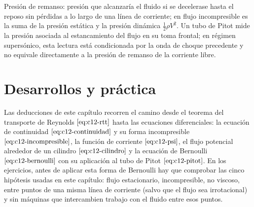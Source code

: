 \documentclass[10pt,openany]{book}
\begin{document}
\begin{tcolorbox}[title={Definición}, studiumdef, breakable]

Presión de remanso: presión que alcanzaría el fluido si se decelerase hasta el reposo sin pérdidas a lo largo de una línea de corriente; en flujo incompresible es la suma de la presión estática y la presión dinámica \(\tfrac12\rho V^{2}\). Un tubo de Pitot mide la presión asociada al estancamiento del flujo en su toma frontal; en régimen supersónico, esta lectura está condicionada por la onda de choque precedente y no equivale directamente a la presión de remanso de la corriente libre.
\end{tcolorbox}





\section{Desarrollos y práctica}

Las deducciones de este capítulo recorren el camino desde el teorema del transporte de Reynolds \(\eqref{eq:c12-rtt}\) hasta las ecuaciones diferenciales: la ecuación de continuidad \(\eqref{eq:c12-continuidad}\) y su forma incompresible \(\eqref{eq:c12-incompresible}\), la función de corriente \(\eqref{eq:c12-psi}\), el flujo potencial alrededor de un cilindro \(\eqref{eq:c12-cilindro}\) y la ecuación de Bernoulli \(\eqref{eq:c12-bernoulli}\) con su aplicación al tubo de Pitot \(\eqref{eq:c12-pitot}\). En los ejercicios, antes de aplicar esta forma de Bernoulli hay que comprobar las cinco hipótesis usadas en este capítulo: flujo estacionario, incompresible, no viscoso, entre puntos de una misma línea de corriente (salvo que el flujo sea irrotacional) y sin máquinas que intercambien trabajo con el fluido entre esos puntos.
\end{document}
